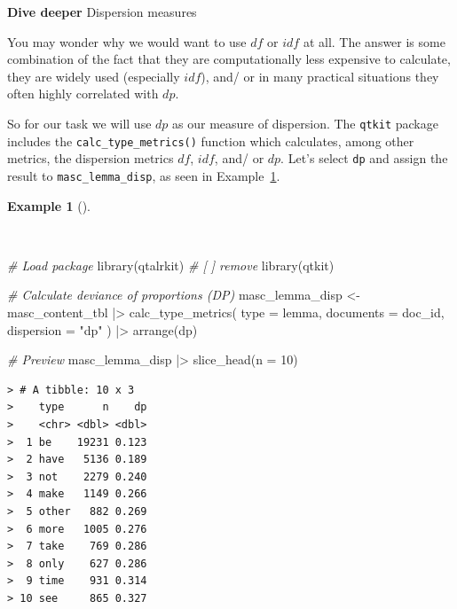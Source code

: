 \documentclass[
  letterpaper,
]{latex/krantz}
\newenvironment{Shaded}{\begin{snugshade}}{\end{snugshade}}
\newcommand{\AttributeTok}[1]{\textcolor[rgb]{0.00,0.00,0.00}{#1}}
\newcommand{\CommentTok}[1]{\textcolor[rgb]{0.00,0.00,0.00}{\textit{#1}}}
\newcommand{\DecValTok}[1]{\textcolor[rgb]{0.00,0.00,0.00}{#1}}
\newcommand{\FunctionTok}[1]{\textcolor[rgb]{0.00,0.00,0.00}{#1}}
\newcommand{\NormalTok}[1]{\textcolor[rgb]{0.00,0.00,0.00}{#1}}
\newcommand{\OtherTok}[1]{\textcolor[rgb]{0.00,0.00,0.00}{#1}}
\newcommand{\SpecialCharTok}[1]{\textcolor[rgb]{0.00,0.00,0.00}{#1}}
\newcommand{\StringTok}[1]{\textcolor[rgb]{0.00,0.00,0.00}{#1}}
\theoremstyle{definition}
\newtheorem{example}{Example}[chapter]
\theoremstyle{remark}
\begin{document}
\begin{tcolorbox}[enhanced jigsaw, breakable, leftrule=.75mm, arc=.35mm, colframe=quarto-callout-color-frame, colback=white, left=2mm, bottomrule=.15mm, rightrule=.15mm, toprule=.15mm, opacityback=0]

\textbf{ Dive deeper} Dispersion measures

You may wonder why we would want to use \(df\) or \(idf\) at all. The
answer is some combination of the fact that they are computationally
less expensive to calculate, they are widely used (especially \(idf\)),
and/ or in many practical situations they often highly correlated with
\(dp\).

\end{tcolorbox}

So for our task we will use \(dp\) as our measure of dispersion. The
\texttt{qtkit} package includes the \texttt{calc\_type\_metrics()}
function which calculates, among other metrics, the dispersion metrics
\(df\), \(idf\), and/ or \(dp\). Let's select \texttt{dp} and assign the
result to \texttt{masc\_lemma\_disp}, as seen in
Example~\ref{exm-eda-masc-dp}.

\begin{example}[]\protect\hypertarget{exm-eda-masc-dp}{}\label{exm-eda-masc-dp}

~

\begin{Shaded}
\begin{Highlighting}[]
\CommentTok{\# Load package}
\FunctionTok{library}\NormalTok{(qtalrkit) }\CommentTok{\# [ ] remove}
\FunctionTok{library}\NormalTok{(qtkit)}

\CommentTok{\# Calculate deviance of proportions (DP)}
\NormalTok{masc\_lemma\_disp }\OtherTok{\textless{}{-}}
\NormalTok{  masc\_content\_tbl }\SpecialCharTok{|\textgreater{}}
  \FunctionTok{calc\_type\_metrics}\NormalTok{(}
    \AttributeTok{type =}\NormalTok{ lemma,}
    \AttributeTok{documents =}\NormalTok{ doc\_id,}
    \AttributeTok{dispersion =} \StringTok{"dp"}
\NormalTok{  ) }\SpecialCharTok{|\textgreater{}}
  \FunctionTok{arrange}\NormalTok{(dp)}

\CommentTok{\# Preview}
\NormalTok{masc\_lemma\_disp }\SpecialCharTok{|\textgreater{}}
  \FunctionTok{slice\_head}\NormalTok{(}\AttributeTok{n =} \DecValTok{10}\NormalTok{)}
\end{Highlighting}
\end{Shaded}

\begin{verbatim}
> # A tibble: 10 x 3
>    type      n    dp
>    <chr> <dbl> <dbl>
>  1 be    19231 0.123
>  2 have   5136 0.189
>  3 not    2279 0.240
>  4 make   1149 0.266
>  5 other   882 0.269
>  6 more   1005 0.276
>  7 take    769 0.286
>  8 only    627 0.286
>  9 time    931 0.314
> 10 see     865 0.327
\end{verbatim}

\end{example}
\end{document}
